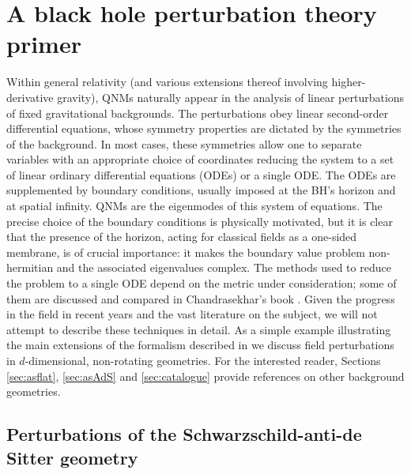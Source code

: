 \documentclass[]{iopart}
\begin{document}
\section{\label{sec:bhperts}A black hole perturbation theory primer}

Within general relativity (and various extensions thereof involving
higher-derivative gravity), QNMs naturally appear in the analysis of linear
perturbations of fixed gravitational backgrounds.  The perturbations obey
linear second-order differential equations, whose symmetry properties are
dictated by the symmetries of the background.  In most cases, these symmetries
allow one to separate variables with an appropriate choice of coordinates
reducing the system to a set of linear ordinary differential equations (ODEs)
or a single ODE.  The ODEs are supplemented by boundary conditions, usually
imposed at the BH's horizon and at spatial infinity.  QNMs are the eigenmodes
of this system of equations.  The precise choice of the boundary conditions is
physically motivated, but it is clear that the presence of the horizon, acting
for classical fields as a one-sided membrane, is of crucial importance: it
makes the boundary value problem non-hermitian and the associated eigenvalues
complex.
% 
The methods used to reduce the problem to a single ODE depend on the metric
under consideration; some of them are discussed and compared in
Chandrasekhar's book \cite{MTB}. Given the progress in the field in recent
years and the vast literature on the subject, we will not attempt to describe
these techniques in detail. As a simple example illustrating the main
extensions of the formalism described in \cite{MTB} we discuss field
perturbations in $d$-dimensional, non-rotating geometries. For the interested
reader, Sections \ref{sec:asflat}, \ref{sec:asAdS} and \ref{sec:catalogue}
provide references on other background geometries.

\subsection{Perturbations of the Schwarzschild-anti-de Sitter geometry}
\end{document}
